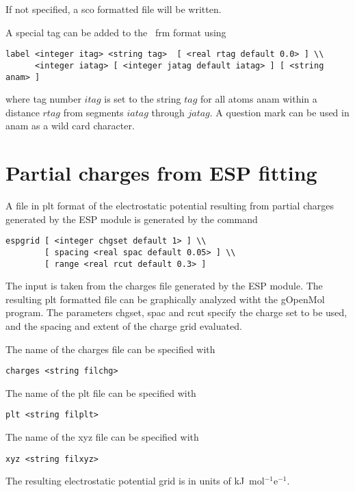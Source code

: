 If not specified, a {\rm sco} formatted file will be written.

A special tag can be added to the \ecce\ frm format using

\begin{verbatim}
label <integer itag> <string tag>  [ <real rtag default 0.0> ] \\
      <integer iatag> [ <integer jatag default iatag> ] [ <string anam> ]
\end{verbatim}

where tag number $itag$ is set to the string $tag$ for all atoms
anam within a distance $rtag$ from segments $iatag$ through $jatag$.
A question mark can be used in anam as a wild card character.

\section{Partial charges from ESP fitting}

A file in plt format of the electrostatic potential resulting
from partial charges generated by the ESP module is generated
by the command

\begin{verbatim}
espgrid [ <integer chgset default 1> ] \\
        [ spacing <real spac default 0.05> ] \\
        [ range <real rcut default 0.3> ]
\end{verbatim}

The input is taken from the charges file generated by the ESP module. The
resulting plt formatted file can be graphically analyzed witht the
gOpenMol program. The parameters chgset, spac and rcut specify the
charge set to be used, and the spacing and extent of the charge grid
evaluated.

The name of the charges file can be specified with

\begin{verbatim}
charges <string filchg>
\end{verbatim}

The name of the plt file can be specified with

\begin{verbatim}
plt <string filplt>
\end{verbatim}

The name of the xyz file can be specified with

\begin{verbatim}
xyz <string filxyz>
\end{verbatim}

The resulting electrostatic potential grid is in units of
kJ\ mol$^{-1}$e$^{-1}$.